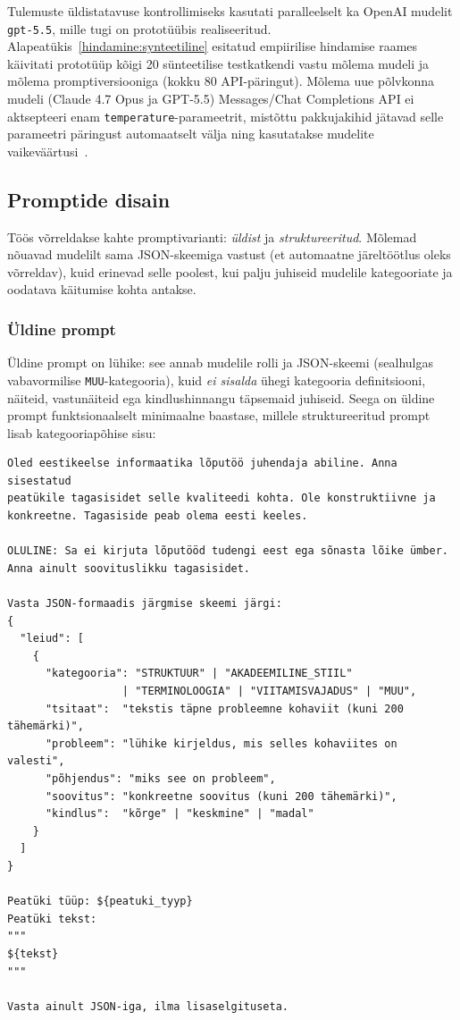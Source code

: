 Tulemuste üldistatavuse kontrollimiseks kasutati paralleelselt ka OpenAI mudelit \texttt{gpt-5.5}, mille tugi on prototüübis realiseeritud. Alapeatükis~\ref{hindamine:synteetiline} esitatud empiirilise hindamise raames käivitati prototüüp kõigi 20 sünteetilise testkatkendi vastu mõlema mudeli ja mõlema promptiversiooniga (kokku 80 API-päringut). Mõlema uue põlvkonna mudeli (Claude 4.7 Opus ja GPT-5.5) Messages/Chat Completions API ei aktsepteeri enam \texttt{temperature}-parameetrit, mistõttu pakkujakihid jätavad selle parameetri päringust automaatselt välja ning kasutatakse mudelite vaikeväärtusi~\cite{anthropic_models_2026, openai_gpt5_2026}.

\subsection{Promptide disain} \label{metoodika:promptid}

Töös võrreldakse kahte promptivarianti: \emph{üldist} ja \emph{struktureeritud}. Mõlemad nõuavad mudelilt sama JSON-skeemiga vastust (et automaatne järeltöötlus oleks võrreldav), kuid erinevad selle poolest, kui palju juhiseid mudelile kategooriate ja oodatava käitumise kohta antakse.

\subsubsection{Üldine prompt}

Üldine prompt on lühike: see annab mudelile rolli ja JSON-skeemi (sealhulgas vabavormilise \texttt{MUU}-kategooria), kuid \emph{ei sisalda} ühegi kategooria definitsiooni, näiteid, vastunäiteid ega kindlushinnangu täpsemaid juhiseid. Seega on üldine prompt funktsionaalselt minimaalne baastase, millele struktureeritud prompt lisab kategooriapõhise sisu:

\begin{verbatim}
Oled eestikeelse informaatika lõputöö juhendaja abiline. Anna sisestatud
peatükile tagasisidet selle kvaliteedi kohta. Ole konstruktiivne ja
konkreetne. Tagasiside peab olema eesti keeles.

OLULINE: Sa ei kirjuta lõputööd tudengi eest ega sõnasta lõike ümber.
Anna ainult soovituslikku tagasisidet.

Vasta JSON-formaadis järgmise skeemi järgi:
{
  "leiud": [
    {
      "kategooria": "STRUKTUUR" | "AKADEEMILINE_STIIL"
                  | "TERMINOLOOGIA" | "VIITAMISVAJADUS" | "MUU",
      "tsitaat":  "tekstis täpne probleemne kohaviit (kuni 200 tähemärki)",
      "probleem": "lühike kirjeldus, mis selles kohaviites on valesti",
      "põhjendus": "miks see on probleem",
      "soovitus": "konkreetne soovitus (kuni 200 tähemärki)",
      "kindlus":  "kõrge" | "keskmine" | "madal"
    }
  ]
}

Peatüki tüüp: ${peatuki_tyyp}
Peatüki tekst:
"""
${tekst}
"""

Vasta ainult JSON-iga, ilma lisaselgituseta.
\end{verbatim}

